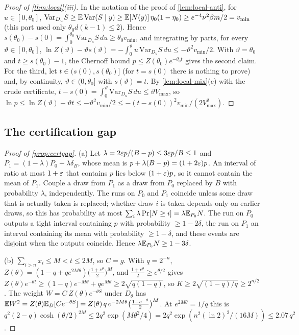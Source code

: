 \begin{proof}[Proof of \cref{thm:local}(iii)]
In the notation of the proof of \cref{lem:local-anti}, for $u\in[0,\theta_0]$,
$\mathrm{Var}_{D_u}S\ge\mathbb{E}\,\mathrm{Var}(S\mid y)\ge\mathbb{E}[N(y)]\,\eta_0(1-\eta_0)\ge e^{-4}\nu^2\beta m/2=v_{\min}$ (this
part used only $\theta_0d(k-1)\le2$). Hence $s(\theta_0)-s(0)=\int_0^{\theta_0}\mathrm{Var}_{D_u}S\,du\ge\theta_0v_{\min}$,
and integrating by parts, for every $\vartheta\in[0,\theta_0]$,
$\ln Z(\vartheta)-\vartheta s(\vartheta)=-\int_0^{\vartheta}u\,\mathrm{Var}_{D_u}S\,du\le-\vartheta^2v_{\min}/2$. With
$\vartheta=\theta_0$ and $t\ge s(\theta_0)-1$, the Chernoff bound $p\le Z(\theta_0)e^{-\theta_0t}$ gives the
second claim. For the third, let $t\in(s(0),s(\theta_0)]$ (for $t=s(0)$ there is nothing to prove)
and, by continuity, $\vartheta\in(0,\theta_0]$ with $s(\vartheta)=t$. By \cref{lem:local-mix}(c) with the
crude certificate, $t-s(0)=\int_0^\vartheta\mathrm{Var}_{D_u}S\,du\le\vartheta V_{\max}$, so
$\ln p\le\ln Z(\vartheta)-\vartheta t\le-\vartheta^2v_{\min}/2\le-(t-s(0))^2v_{\min}/(2V_{\max}^2)$.
\end{proof}

\subsection{The certification gap}

\begin{proof}[Proof of \cref{prop:certgap}]
(a) Let $\lambda=2\varepsilon p/(B-p)\le3\varepsilon p/B\le1$ and $P_1=(1-\lambda)P_0+\lambda\delta_B$, whose mean is
$p+\lambda(B-p)=(1+2\varepsilon)p$. An interval of ratio at most $1+\varepsilon$ that contains $p$ lies below
$(1+\varepsilon)p$, so it cannot contain the mean of $P_1$. Couple a draw from $P_1$ as a draw from
$P_0$ replaced by $B$ with probability $\lambda$, independently. The runs on $P_0$ and $P_1$
coincide unless some draw that is actually taken is replaced; whether draw $i$ is taken depends
only on earlier draws, so this has probability at most $\sum_i\lambda\Pr[N\ge i]=\lambda\mathbb{E}_{P_0}N$.
The run on $P_0$ outputs a tight interval containing $p$ with probability $\ge1-2\delta$, the run
on $P_1$ an interval containing its mean with probability $\ge1-\delta$, and these events are
disjoint when the outputs coincide. Hence $\lambda\mathbb{E}_{P_0}N\ge1-3\delta$.

(b) $\sum_{i>n}x_i\le M<t\le2M$, so $C=g$. With $q=2^{-n}$,
$Z(\theta)=(1-q+qe^{2M\theta})\big(\frac{1+e^\theta}2\big)^M$, and $\frac{1+e^\theta}2\ge e^{\theta/2}$ gives
$Z(\theta)e^{-\theta t}\ge(1-q)e^{-M\theta}+qe^{M\theta}\ge2\sqrt{q(1-q)}$, so
$K\ge2\sqrt{(1-q)/q}\ge2^{n/2}$. The weight $W=C\,Z(\theta)e^{-\theta S}$ under $D_\theta$ has
$\mathbb{E} W^2=Z(\theta)\mathbb{E}_D[Ce^{-\theta S}]=Z(\theta)\,q\,e^{-2M\theta}\big(\frac{1+e^{-\theta}}2\big)^M$. At
$e^{2M\theta}=1/q$ this is $q^2(2-q)\cosh(\theta/2)^{2M}\le2q^2\exp(M\theta^2/4)=2q^2\exp(n^2(\ln
2)^2/(16M))\le2.07\,q^2$.
\end{proof}
